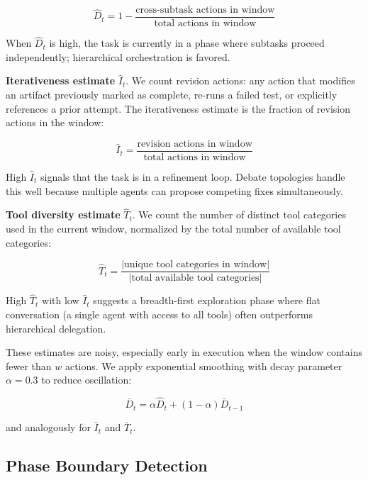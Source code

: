 \begin{equation}
\hat{D}_t = 1 - \frac{\text{cross-subtask actions in window}}{\text{total actions in window}}
\end{equation}

When \(\hat{D}_t\) is high, the task is currently in a phase where
subtasks proceed independently; hierarchical orchestration is favored.

\textbf{Iterativeness estimate} \(\hat{I}_t\). We count revision
actions: any action that modifies an artifact previously marked as
complete, re-runs a failed test, or explicitly references a prior
attempt. The iterativeness estimate is the fraction of revision actions
in the window:

\begin{equation}
\hat{I}_t = \frac{\text{revision actions in window}}{\text{total actions in window}}
\end{equation}

High \(\hat{I}_t\) signals that the task is in a refinement loop. Debate
topologies handle this well because multiple agents can propose
competing fixes simultaneously.

\textbf{Tool diversity estimate} \(\hat{T}_t\). We count the number of
distinct tool categories used in the current window, normalized by the
total number of available tool categories:

\begin{equation}
\hat{T}_t = \frac{|\text{unique tool categories in window}|}{|\text{total available tool categories}|}
\end{equation}

High \(\hat{T}_t\) with low \(\hat{I}_t\) suggests a breadth-first
exploration phase where flat conversation (a single agent with access to
all tools) often outperforms hierarchical delegation.

These estimates are noisy, especially early in execution when the window
contains fewer than \(w\) actions. We apply exponential smoothing with
decay parameter \(\alpha = 0.3\) to reduce oscillation:

\begin{equation}
\bar{D}_t = \alpha \hat{D}_t + (1 - \alpha) \bar{D}_{t-1}
\end{equation}

and analogously for \(\bar{I}_t\) and \(\bar{T}_t\).

\subsection{Phase Boundary Detection}\label{phase-boundary-detection}

